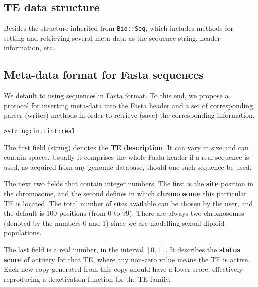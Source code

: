 \documentclass[10pt]{article}
\begin{document}

\subsection{TE data structure}

Besides the structure inherited from \verb|Bio::Seq|, which includes
methods for setting and retrieving several meta-data as the sequence
string, header information, etc.



\subsection{Meta-data format for Fasta sequences}

We default to using sequences in Fasta format. To this end, we propose
a protocol for inserting meta-data into the Fasta header and a set of
corresponding parser (writer) methods in order to retrieve (save) the
corresponding information.


\bigskip
\verb|>string:int:int:real|
\bigskip

The first field (string) denotes the {\bf TE description}. It can vary
in size and can contain spaces. Usually it comprises the whole Fasta
header if a real sequence is used, as acquired from any genomic
database, should one such sequence be used.

The next two fields that contain integer numbers. The first is the
{\bf site} position in the chromosome, and the second defines in which
{\bf chromosome} this particular TE is located. The total number of
sites available can be chosen by the user, and the default is 100
positions (from 0 to 99). There are always two chromosomes (denoted by
the numbers 0 and 1) since we are modelling sexual diploid
populations.

The last field is a real number, in the interval $[0,1]$. It describes
the {\bf status score} of activity for that TE, where any non-zero
value means the TE is active. Each new copy generated from this copy
should have a lower score, effectively reproducing a deactivation
function for the TE family.
\end{document}
